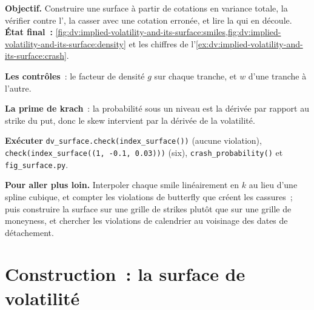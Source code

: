 \begin{tutorial}
\textbf{Objectif.} Construire une surface à partir de cotations en variance totale, la vérifier contre l', la casser avec une cotation erronée, et lire la  qui en découle. \textbf{État final~:}
\cref{fig:dv:implied-volatility-and-its-surface:smiles,fig:dv:implied-volatility-and-its-surface:density}
et les chiffres de l'\cref{ex:dv:implied-volatility-and-its-surface:crash}.
\begin{tutsteps}
\item \textbf{Les contrôles}~: le facteur de densité $g$ sur chaque tranche, et $w$ d'une tranche à l'autre.
\label{lst:dv:implied-volatility-and-its-surface:check}
\item \textbf{La prime de krach}~: la probabilité sous un niveau est la dérivée par rapport au strike du put, donc le skew
intervient par la dérivée de la volatilité.
\label{lst:dv:implied-volatility-and-its-surface:crash}
\item \textbf{Exécuter} \texttt{dv\_surface.check(index\_surface())} (aucune violation),
\texttt{check(index\_surface((1, -0.1, 0.03)))} (six), \texttt{crash\_probability()} et
\texttt{fig\_surface.py}.
\end{tutsteps}
\textbf{Pour aller plus loin.} Interpoler chaque smile linéairement en $k$ au lieu d'une spline cubique, et compter les violations
de butterfly que créent les cassures~; puis construire la surface sur une grille de strikes plutôt que sur une grille de
moneyness, et chercher les violations de calendrier au voisinage des dates de détachement.
\end{tutorial}

\section{Construction~: la surface de volatilité}\label{bld:dv:implied-volatility-and-its-surface:volsurface}

